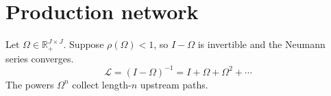 \documentclass{article}
\begin{document}
\section{Production network}
Let $\Omega\in\mathbb{R}^{J\times J}_{+}$. Suppose $\rho(\Omega)<1$,
so $I-\Omega$ is invertible and the Neumann series converges.
\begin{equation}
  \mathcal L=(I-\Omega)^{-1}=I+\Omega+\Omega^2+\cdots
  \label{eq:leontief}
\end{equation}
The powers $\Omega^n$ collect length-$n$ upstream paths.
\end{document}
